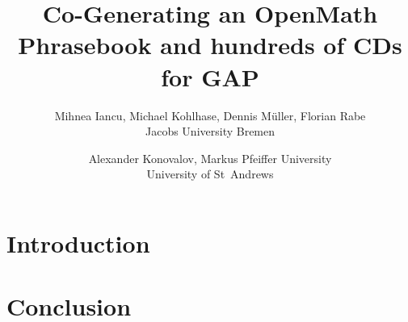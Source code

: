 \documentclass[a4paper]{article}
\author{
  Mihnea Iancu, Michael Kohlhase, Dennis M\"uller, Florian Rabe\\  Jacobs University Bremen \and 
  Alexander Konovalov, Markus Pfeiffer University\\ University  of St~Andrews 
}
\title{Co-Generating an OpenMath Phrasebook and hundreds of CDs for GAP}
\begin{document}
\maketitle
\begin{abstract}
\end{abstract}
\section{Introduction}\label{sec:intro}
\section{Conclusion}\label{sec:concl}
\printbibliography
\end{document}
